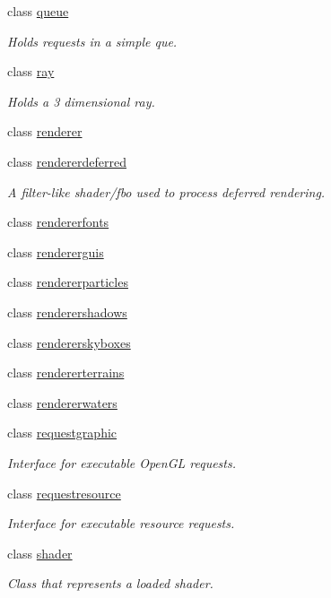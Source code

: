 \begin{DoxyCompactItemize}
class \hyperlink{classflounder_1_1queue}{queue}
\begin{DoxyCompactList}\small\item\em Holds requests in a simple que. \end{DoxyCompactList}\item 
class \hyperlink{classflounder_1_1ray}{ray}
\begin{DoxyCompactList}\small\item\em Holds a 3 dimensional ray. \end{DoxyCompactList}\item 
class \hyperlink{classflounder_1_1renderer}{renderer}
\item 
class \hyperlink{classflounder_1_1rendererdeferred}{rendererdeferred}
\begin{DoxyCompactList}\small\item\em A filter-\/like shader/fbo used to process deferred rendering. \end{DoxyCompactList}\item 
class \hyperlink{classflounder_1_1rendererfonts}{rendererfonts}
\item 
class \hyperlink{classflounder_1_1rendererguis}{rendererguis}
\item 
class \hyperlink{classflounder_1_1rendererparticles}{rendererparticles}
\item 
class \hyperlink{classflounder_1_1renderershadows}{renderershadows}
\item 
class \hyperlink{classflounder_1_1rendererskyboxes}{rendererskyboxes}
\item 
class \hyperlink{classflounder_1_1rendererterrains}{rendererterrains}
\item 
class \hyperlink{classflounder_1_1rendererwaters}{rendererwaters}
\item 
class \hyperlink{classflounder_1_1requestgraphic}{requestgraphic}
\begin{DoxyCompactList}\small\item\em Interface for executable Open\+GL requests. \end{DoxyCompactList}\item 
class \hyperlink{classflounder_1_1requestresource}{requestresource}
\begin{DoxyCompactList}\small\item\em Interface for executable resource requests. \end{DoxyCompactList}\item 
class \hyperlink{classflounder_1_1shader}{shader}
\begin{DoxyCompactList}\small\item\em Class that represents a loaded shader. \end{DoxyCompactList}\item 

\end{DoxyCompactItemize}
